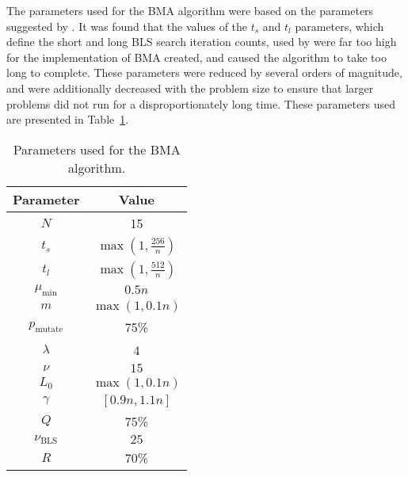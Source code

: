 {{{        The parameters used for the BMA algorithm were based on the parameters suggested by \citet{Benlic:2015gp}.
        It was found that the values of the \(t_s\) and \(t_l\) parameters, which define the short and long BLS search iteration counts, used by \citeauthor{Benlic:2015gp} were far too high for the implementation of BMA created, and caused the algorithm to take too long to complete.
        These parameters were reduced by several orders of magnitude, and were additionally decreased with the problem size to ensure that larger problems did not run for a disproportionately long time.
        These parameters used are presented in Table~\ref{tab:params-bma}.

        \begin{table}[h]
            \centering
            \caption{Parameters used for the BMA algorithm.}
            \label{tab:params-bma}
            \begin{tabularx}{0.3\textwidth}{@{}c|c@{}}
                \toprule
                Parameter & Value \\
                \midrule
                \(N\)  & 15 \\
                \(t_s\)  & \(\operatorname{max}(1, \frac{256}{n})\) \\
                \(t_l\)  & \(\operatorname{max}(1, \frac{512}{n})\) \\
                \(\mu_\text{min}\) & \(0.5n\) \\
                \(m\) & \(\operatorname{max}(1, 0.1n)\) \\
                \(p_\text{mutate}\)  & 75\% \\
                \(\lambda\)  & 4 \\
                \(\nu\) & \(15\) \\
                \(L_0\) & \(\operatorname{max}(1, 0.1n)\) \\
                \(\gamma\) & \([0.9n, 1.1n]\) \\
                \(Q\) & 75\% \\
                \(\nu_\text{BLS}\) & \(25\) \\
                \(R\) & 70\% \\
                \bottomrule
            \end{tabularx}
        \end{table}
    }

}}
